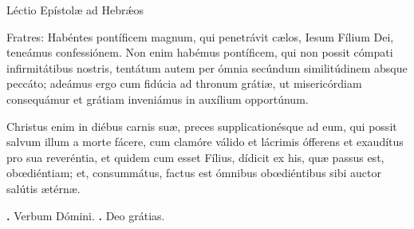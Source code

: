 
Léctio Epístolæ ad Hebr\'{\ae}os

Fratres: Habéntes pontíficem magnum, qui penetrávit cælos, Iesum Fílium Dei, teneámus confessiónem.
Non enim habémus pontíficem, qui non possit cómpati infirmitátibus nostris, tentátum autem per ómnia secúndum similitúdinem absque peccáto; adeámus ergo cum fidúcia ad thronum grátiæ, ut misericórdiam consequámur et grátiam inveniámus in auxílium opportúnum.

Christus enim in diébus carnis suæ, preces supplicationésque ad eum, qui possit salvum illum a morte fácere, cum clamóre válido et lácrimis ófferens et exaudítus pro sua reveréntia, et quidem cum esset Fílius, dídicit ex his, quæ passus est, obœdiéntiam; et, consummátus, factus est ómnibus obœdiéntibus sibi auctor salútis ætérnæ.

\textbf{\Vbar.} Verbum Dómini.
\textbf{\Rbar.} Deo grátias.
\par